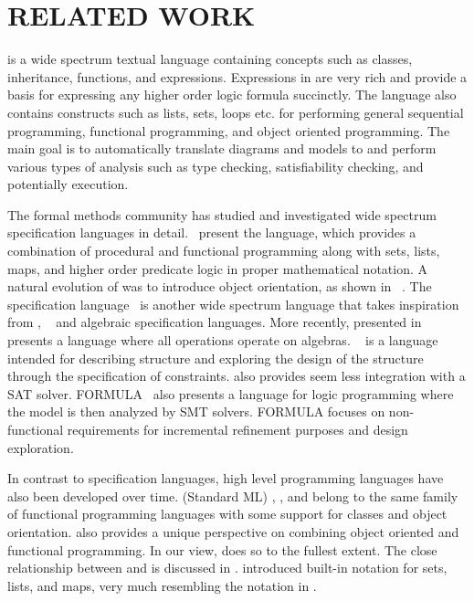 \section{RELATED WORK}
\label{sec:related-work}

\Klang{} is a wide spectrum textual language containing concepts such
as classes, inheritance, functions, and expressions. Expressions in
\Klang{} are very rich and provide a basis for expressing any higher
order logic formula succinctly. The language also contains constructs
such as lists, sets, loops etc. for performing general sequential
programming, functional programming, and object oriented
programming. The main goal is to automatically translate \sysml{}
diagrams and models to \Klang{} and perform various types of analysis
such as type checking, satisfiability checking, and potentially
execution.

The formal methods community has studied and investigated wide
spectrum specification languages in
detail.~\cite{vdm78,bjoerner-jones-82,jones90,jones-shaw-90} present
the \vdm{} language, which provides a combination of procedural and
functional programming along with sets, lists, maps, and higher order
predicate logic in proper mathematical notation. A natural evolution
of \vdm{} was to introduce object orientation, as shown in
\vdmpp{}~\cite{vdmplusplus05}. The \raiselang{} specification
language~\cite{raise92} is another wide spectrum language that takes
inspiration from \vdm{}, \zlang{}~\cite{spivey-Z-1988} and algebraic
specification languages. More recently, \asml{} presented
in~\cite{asml05} presents a language where all operations operate on
algebras. \alloy{}~\cite{jackson-alloy-12} is a language intended for
describing structure and exploring the design of the structure through
the specification of constraints. \alloy{} also provides seem less
integration with a SAT solver. FORMULA~\cite{jackson2009specifying}
also presents a language for logic programming where the model is then
analyzed by SMT solvers. FORMULA focuses on non-functional
requirements for incremental refinement purposes and design
exploration. 

In contrast to specification languages, high level programming
languages have also been developed over time. \sml{} (Standard ML)
\cite{standard-ml-97}, \ocaml{} \cite{ocaml}, and \haskell{}
\cite{haskell} belong to the same family of functional programming
languages with some support for classes and object
orientation. \python{} \cite{python} also provides a unique
perspective on combining object oriented and functional
programming. In our view, \scala{} \cite{scala} does so to the fullest
extent. The close relationship between \scala{} and \vdm{} is
discussed in \cite{havelund-scala-vdm-12}.  \fortress{}
\cite{fortress} introduced built-in notation for sets, lists, and
maps, very much resembling the notation in \vdm{}.

